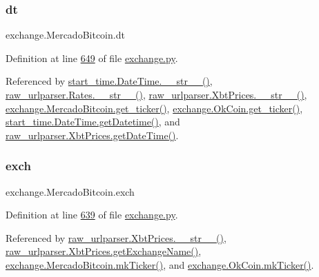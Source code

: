 \mbox{\label{classexchange_1_1_mercado_bitcoin_aeee983ba4f72223a11fb914d22902c56}} 
\subsubsection{\texorpdfstring{dt}{dt}}
{\footnotesize\ttfamily exchange.\+Mercado\+Bitcoin.\+dt}



Definition at line \hyperlink{exchange_8py_source_l00649}{649} of file \hyperlink{exchange_8py_source}{exchange.\+py}.



Referenced by \hyperlink{start__time_2____init_____8py_source_l00034}{start\+\_\+time.\+Date\+Time.\+\_\+\+\_\+str\+\_\+\+\_\+()}, \hyperlink{raw__urlparser_8py_source_l00038}{raw\+\_\+urlparser.\+Rates.\+\_\+\+\_\+str\+\_\+\+\_\+()}, \hyperlink{raw__urlparser_8py_source_l00074}{raw\+\_\+urlparser.\+Xbt\+Prices.\+\_\+\+\_\+str\+\_\+\+\_\+()}, \hyperlink{exchange_8py_source_l00651}{exchange.\+Mercado\+Bitcoin.\+get\+\_\+ticker()}, \hyperlink{exchange_8py_source_l00716}{exchange.\+Ok\+Coin.\+get\+\_\+ticker()}, \hyperlink{start__time_2____init_____8py_source_l00031}{start\+\_\+time.\+Date\+Time.\+get\+Datetime()}, and \hyperlink{raw__urlparser_8py_source_l00059}{raw\+\_\+urlparser.\+Xbt\+Prices.\+get\+Date\+Time()}.

\mbox{\label{classexchange_1_1_mercado_bitcoin_a68701550b43374441e52ea2082d88400}} 
\subsubsection{\texorpdfstring{exch}{exch}}
{\footnotesize\ttfamily exchange.\+Mercado\+Bitcoin.\+exch}



Definition at line \hyperlink{exchange_8py_source_l00639}{639} of file \hyperlink{exchange_8py_source}{exchange.\+py}.



Referenced by \hyperlink{raw__urlparser_8py_source_l00074}{raw\+\_\+urlparser.\+Xbt\+Prices.\+\_\+\+\_\+str\+\_\+\+\_\+()}, \hyperlink{raw__urlparser_8py_source_l00068}{raw\+\_\+urlparser.\+Xbt\+Prices.\+get\+Exchange\+Name()}, \hyperlink{exchange_8py_source_l00665}{exchange.\+Mercado\+Bitcoin.\+mk\+Ticker()}, and \hyperlink{exchange_8py_source_l00730}{exchange.\+Ok\+Coin.\+mk\+Ticker()}.

